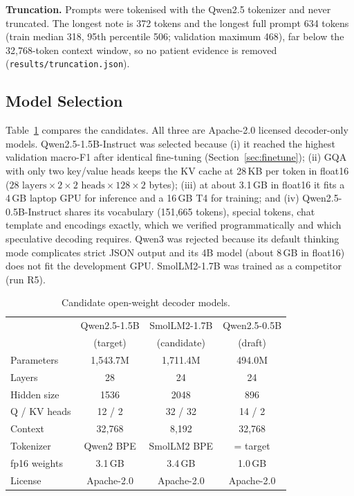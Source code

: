 \documentclass[conference]{IEEEtran}
\newcommand{\code}[1]{\texttt{\small #1}}
\begin{document}
\textbf{Truncation.} Prompts were tokenised with the Qwen2.5 tokenizer and never truncated. The longest note is 372 tokens and the longest full prompt 634 tokens (train median 318, 95th percentile 506; validation maximum 468), far below the 32{,}768-token context window, so no patient evidence is removed (\code{results/truncation.json}).

\subsection{Model Selection}
Table~\ref{tab:models} compares the candidates. All three are Apache-2.0 licensed decoder-only models. Qwen2.5-1.5B-Instruct was selected because (i) it reached the highest validation macro-F1 after identical fine-tuning (Section~\ref{sec:finetune}); (ii) GQA with only two key/value heads keeps the KV cache at 28\,KB per token in float16 ($28\text{ layers}\times2\times2\text{ heads}\times128\times2$ bytes); (iii) at about 3.1\,GB in float16 it fits a 4\,GB laptop GPU for inference and a 16\,GB T4 for training; and (iv) Qwen2.5-0.5B-Instruct shares its vocabulary (151{,}665 tokens), special tokens, chat template and encodings exactly, which we verified programmatically and which speculative decoding requires. Qwen3 was rejected because its default thinking mode complicates strict JSON output and its 4B model (about 8\,GB in float16) does not fit the development GPU. SmolLM2-1.7B was trained as a competitor (run R5).

\begin{table}[t]
\centering
\caption{Candidate open-weight decoder models.}
\label{tab:models}
\setlength{\tabcolsep}{3pt}
\begin{tabular}{lccc}
\toprule
 & Qwen2.5-1.5B & SmolLM2-1.7B & Qwen2.5-0.5B \\
 & (target) & (candidate) & (draft) \\
\midrule
Parameters & 1{,}543.7M & 1{,}711.4M & 494.0M \\
Layers & 28 & 24 & 24 \\
Hidden size & 1536 & 2048 & 896 \\
Q / KV heads & 12 / 2 & 32 / 32 & 14 / 2 \\
Context & 32{,}768 & 8{,}192 & 32{,}768 \\
Tokenizer & Qwen2 BPE & SmolLM2 BPE & = target \\
fp16 weights & 3.1\,GB & 3.4\,GB & 1.0\,GB \\
License & Apache-2.0 & Apache-2.0 & Apache-2.0 \\
\bottomrule
\end{tabular}
\end{table}
\end{document}
